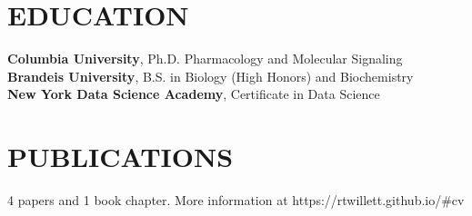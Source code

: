 \documentclass[11pt]{article}
\begin{document}
\section*{EDUCATION}
{\bfseries Columbia University}, Ph.D. Pharmacology and Molecular Signaling \\
{\bfseries Brandeis University}, B.S. in Biology (High Honors) and Biochemistry \\
{\bfseries New York Data Science Academy}, Certificate in Data Science

\section*{PUBLICATIONS}
4 papers and 1 book chapter. More information at https://rtwillett.github.io/\#cv
\end{document}
